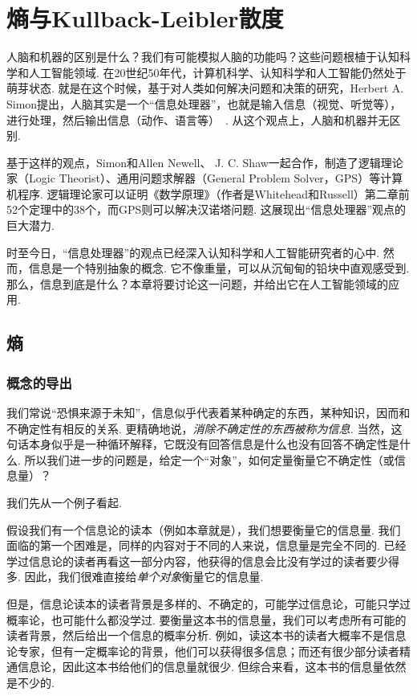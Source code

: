 \chapter{熵与Kullback-Leibler散度}\label{chap:information-theory}

人脑和机器的区别是什么？我们有可能模拟人脑的功能吗？这些问题根植于认知科学和人工智能领域. 在20世纪50年代，计算机科学、认知科学和人工智能仍然处于萌芽状态. 就是在这个时候，基于对人类如何解决问题和决策的研究，Herbert A. Simon提出，人脑其实是一个“信息处理器”，也就是输入信息（视觉、听觉等），进行处理，然后输出信息（动作、语言等）~\cite{simonInformationprocessingModelsCognition1981}. 从这个观点上，人脑和机器并无区别. 

基于这样的观点，Simon和Allen Newell、 J. C. Shaw一起合作，制造了逻辑理论家（Logic Theorist）、通用问题求解器（General Problem Solver，GPS）等计算机程序. 逻辑理论家可以证明《数学原理》（作者是Whitehead和Russell）第二章前52个定理中的38个，而GPS则可以解决汉诺塔问题. 这展现出“信息处理器”观点的巨大潜力. 

时至今日，“信息处理器”的观点已经深入认知科学和人工智能研究者的心中. 然而，信息是一个特别抽象的概念. 它不像重量，可以从沉甸甸的铅块中直观感受到. 那么，信息到底是什么？本章将要讨论这一问题，并给出它在人工智能领域的应用. 

\section{熵}\label{sec:entropy}


\subsection{概念的导出}

我们常说“恐惧来源于未知”，信息似乎代表着某种确定的东西，某种知识，因而和不确定性有相反的关系. 更精确地说，\textit{消除不确定性的东西被称为信息.} 当然，这句话本身似乎是一种循环解释，它既没有回答信息是什么也没有回答不确定性是什么. 所以我们进一步的问题是，给定一个“对象”，如何定量衡量它不确定性（或信息量）？

我们先从一个例子看起. 
\begin{example}[信息论读本]
    假设我们有一个信息论的读本（例如本章就是），我们想要衡量它的信息量. 我们面临的第一个困难是，同样的内容对于不同的人来说，信息量是完全不同的. 已经学过信息论的读者再看这一部分内容，他获得的信息会比没有学过的读者要少得多. 因此，我们很难直接给\textit{单个对象}衡量它的信息量. 

    但是，信息论读本的读者背景是多样的、不确定的，可能学过信息论，可能只学过概率论，也可能什么都没学过. 要衡量这本书的信息量，我们可以考虑所有可能的读者背景，然后给出一个信息的概率分析. 例如，读这本书的读者大概率不是信息论专家，但有一定概率论的背景，他们可以获得很多信息；而还有很少部分读者精通信息论，因此这本书给他们的信息量就很少. 但综合来看，这本书的信息量依然是不少的. 
\end{example}

